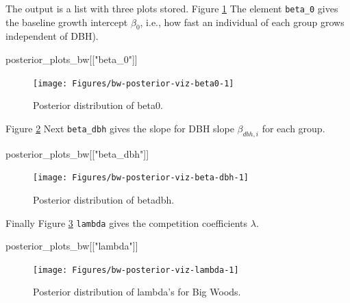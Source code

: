 \documentclass[12pt]{article}
\newenvironment{Shaded}{\begin{snugshade}}{\end{snugshade}}
\newcommand{\NormalTok}[1]{#1}
\newcommand{\StringTok}[1]{\textcolor[rgb]{0.31,0.60,0.02}{#1}}
\begin{document}
The output is a list with three plots stored. Figure
\ref{fig:bw-posterior-viz-beta0} The element \texttt{beta\_0} gives the
baseline growth intercept \(\beta_0\), i.e., how fast an individual of
each group grows independent of DBH).

\begin{Shaded}
\begin{Highlighting}[]
\NormalTok{posterior_plots_bw[[}\StringTok{"beta_0"}\NormalTok{]]}
\end{Highlighting}
\end{Shaded}

\begin{figure}

{\centering \texttt{[image: Figures/bw-posterior-viz-beta0-1]} 

}

\caption{Posterior distribution of beta0.}\label{fig:bw-posterior-viz-beta0}
\end{figure}

Figure \ref{fig:bw-posterior-viz-beta-dbh} Next \texttt{beta\_dbh} gives
the slope for DBH slope \(\beta_{dbh,i}\) for each group.

\begin{Shaded}
\begin{Highlighting}[]
\NormalTok{posterior_plots_bw[[}\StringTok{"beta_dbh"}\NormalTok{]]}
\end{Highlighting}
\end{Shaded}

\begin{figure}

{\centering \texttt{[image: Figures/bw-posterior-viz-beta-dbh-1]} 

}

\caption{Posterior distribution of betadbh.}\label{fig:bw-posterior-viz-beta-dbh}
\end{figure}

Finally Figure \ref{fig:bw-posterior-viz-lambda} \texttt{lambda} gives
the competition coefficients \(\lambda\).

\begin{Shaded}
\begin{Highlighting}[]
\NormalTok{posterior_plots_bw[[}\StringTok{"lambda"}\NormalTok{]]}
\end{Highlighting}
\end{Shaded}

\begin{figure}

{\centering \texttt{[image: Figures/bw-posterior-viz-lambda-1]} 

}

\caption{Posterior distribution of lambda's for Big Woods.}\label{fig:bw-posterior-viz-lambda}
\end{figure}
\end{document}
